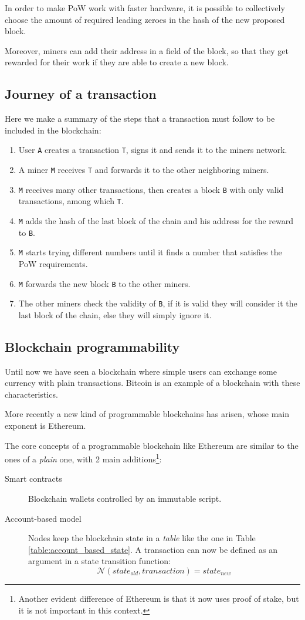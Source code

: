 \documentclass[11pt]{article}
\begin{document}
In order to make PoW work with faster hardware, it is possible to collectively choose the amount of required leading zeroes in the hash of the new proposed block.

Moreover, miners can add their address in a field of the block, so that they get rewarded for their work if they are able to create a new block.

\subsection{Journey of a transaction} \label{subsection:joat}
Here we make a summary of the steps that a transaction must follow to be included in the blockchain:
\begin{enumerate}
    \item User \verb|A| creates a transaction \verb|T|, signs it and sends it to the miners network.
    \item A miner \verb|M| receives \verb|T| and forwards it to the other neighboring miners.
    \item \verb|M| receives many other transactions, then creates a block \verb|B| with only valid transactions, among which \verb|T|.
    \item \verb|M| adds the hash of the last block of the chain and his address for the reward to \verb|B|.
    \item \verb|M| starts trying different numbers until it finds a number that satisfies the PoW requirements.
    \item \verb|M| forwards the new block \verb|B| to the other miners. 
    \item The other miners check the validity of \verb|B|, if it is valid they will consider it the last block of the chain, else they will simply ignore it.
\end{enumerate}

\subsection{Blockchain programmability} \label{subsection:programmability}
Until now we have seen a blockchain where simple users can exchange some currency with plain transactions. Bitcoin is an example of a blockchain with these characteristics.

More recently a new kind of programmable blockchains has arisen, whose main exponent is Ethereum. 

The core concepts of a programmable blockchain like Ethereum are similar to the ones of a \textit{plain} one, with 2 main additions\footnote{Another evident difference of Ethereum is that it now uses proof of stake, but it is not important in this context.}:
\begin{description}
    \item[Smart contracts] Blockchain wallets controlled by an immutable script.
    \item[Account-based model] Nodes keep the blockchain state in a \textit{table} like the one in Table \ref{table:account_based_state}. A transaction can now be defined as an argument in a state transition function: 
    \[\mathcal{N} (state_{old}, transaction) = state_{new}\]
\end{description}
\end{document}
